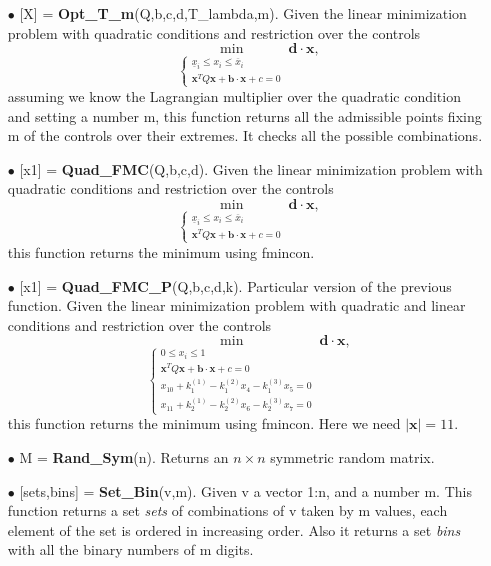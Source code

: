 \documentclass[12pt]{article}
\theoremstyle{definition}
\theoremstyle{remark}
\begin{document}
\begin{enumerate}
\item[$\bullet$] [X] = \textbf{Opt\_T\_m}(Q,b,c,d,T\_lambda,m). Given the linear minimization problem with quadratic conditions and restriction over the controls
\begin{equation*}
\min_{\begin{cases}
\underline{x}_i\leq x_i\leq\overline{x}_i\\
\bm{x}^TQ\bm{x}+\bm{b}\cdot\bm{x}+c=0
\end{cases}} \bm{d}\cdot\bm{x},
\end{equation*}
assuming we know the Lagrangian multiplier over the quadratic condition and setting a number m, this function returns all the admissible points fixing m of the controls over their extremes. It checks all the possible combinations.

\item[$\bullet$] [x1] = \textbf{Quad\_FMC}(Q,b,c,d). Given the linear minimization problem with quadratic conditions and restriction over the controls
\begin{equation*}
\min_{\begin{cases}
\underline{x}_i\leq x_i\leq\overline{x}_i\\
\bm{x}^TQ\bm{x}+\bm{b}\cdot\bm{x}+c=0
\end{cases}} \bm{d}\cdot\bm{x},
\end{equation*}
this function returns the minimum using fmincon.

\item[$\bullet$] [x1] = \textbf{Quad\_FMC\_P}(Q,b,c,d,k). Particular version of the previous function. Given the linear minimization problem with quadratic  and linear conditions and restriction over the controls
\begin{equation*}
\min_{\begin{cases}
0\leq x_i\leq1\\
\bm{x}^TQ\bm{x}+\bm{b}\cdot\bm{x}+c=0\\
x_{10}+k_1^{(1)}-k_1^{(2)}x_4-k_1^{(3)}x_5=0\\
x_{11}+k_2^{(1)}-k_2^{(2)}x_6-k_2^{(3)}x_7=0
\end{cases}} \bm{d}\cdot\bm{x},
\end{equation*}
this function returns the minimum using fmincon. Here we need $|\bm{x}|=11$.

\item[$\bullet$] M = \textbf{Rand\_Sym}(n). Returns an $n\times n$ symmetric random matrix.

\item[$\bullet$] [sets,bins] = \textbf{Set\_Bin}(v,m). Given v a vector 1:n, and a number m. This function returns a set \emph{sets} of combinations of v taken by m values, each element of the set is ordered in increasing order. Also it returns a set \textit{bins} with all the binary numbers of m digits.


\end{enumerate}
\end{document}
